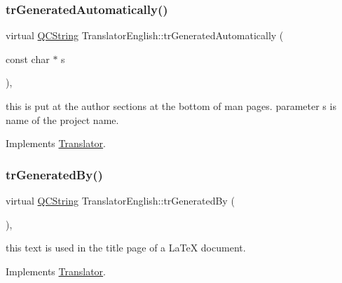 \mbox{\label{class_translator_english_a1836b11b327ddfb5c2333c5364c818b7}} 
\subsubsection{\texorpdfstring{trGeneratedAutomatically()}{trGeneratedAutomatically()}}
{\footnotesize\ttfamily virtual \mbox{\hyperlink{class_q_c_string}{Q\+C\+String}} Translator\+English\+::tr\+Generated\+Automatically (\begin{DoxyParamCaption}\item[{const char $\ast$}]{s }\end{DoxyParamCaption})\hspace{0.3cm}{\ttfamily [inline]}, {\ttfamily [virtual]}}

this is put at the author sections at the bottom of man pages. parameter s is name of the project name. 

Implements \mbox{\hyperlink{class_translator}{Translator}}.

\mbox{\label{class_translator_english_aa7af04a2122179c01a961362c8b281f9}} 
\subsubsection{\texorpdfstring{trGeneratedBy()}{trGeneratedBy()}}
{\footnotesize\ttfamily virtual \mbox{\hyperlink{class_q_c_string}{Q\+C\+String}} Translator\+English\+::tr\+Generated\+By (\begin{DoxyParamCaption}{ }\end{DoxyParamCaption})\hspace{0.3cm}{\ttfamily [inline]}, {\ttfamily [virtual]}}

this text is used in the title page of a La\+TeX document. 

Implements \mbox{\hyperlink{class_translator}{Translator}}.

\mbox{\label{class_translator_english_acbc0e7617307f4cc3bf459fda93ffdfb}} 
